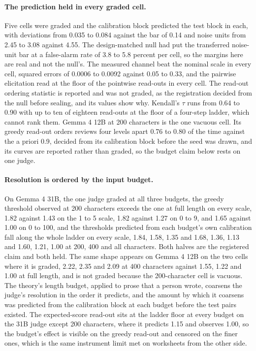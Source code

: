 \paragraph{The prediction held in every graded cell.}
Five cells were graded and the calibration block predicted the test block in each, with deviations from 0.035 to 0.084 against the bar of 0.14 and noise units from 2.45 to 3.08 against 4.55. The design-matched null had put the transferred noise-unit bar at a false-alarm rate of 3.8 to 5.8 percent per cell, so the margins here are real and not the null's. The measured channel beat the nominal scale in every cell, squared errors of 0.0006 to 0.0092 against 0.05 to 0.33, and the pairwise elicitation read at the floor of the pointwise read-outs in every cell. The read-out ordering statistic is reported and was not graded, as the registration decided from the null before sealing, and its values show why. Kendall's $\tau$ runs from 0.64 to 0.90 with up to ten of eighteen read-outs at the floor of a four-step ladder, which cannot rank them. Gemma 4 12B at 200 characters is the one vacuous cell. Its greedy read-out orders reviews four levels apart 0.76 to 0.80 of the time against the a priori 0.9, decided from its calibration block before the seed was drawn, and its curves are reported rather than graded, so the budget claim below rests on one judge.

\paragraph{Resolution is ordered by the input budget.}
On Gemma 4 31B, the one judge graded at all three budgets, the greedy threshold observed at 200 characters exceeds the one at full length on every scale, 1.82 against 1.43 on the 1 to 5 scale, 1.82 against 1.27 on 0 to 9, and 1.65 against 1.00 on 0 to 100, and the thresholds predicted from each budget's own calibration fall along the whole ladder on every scale, 1.84, 1.58, 1.35 and 1.68, 1.36, 1.13 and 1.60, 1.21, 1.00 at 200, 400 and all characters. Both halves are the registered claim and both held. The same shape appears on Gemma 4 12B on the two cells where it is graded, 2.22, 2.35 and 2.09 at 400 characters against 1.55, 1.22 and 1.00 at full length, and is not graded because the 200-character cell is vacuous. The theory's length budget, applied to prose that a person wrote, coarsens the judge's resolution in the order it predicts, and the amount by which it coarsens was predicted from the calibration block at each budget before the test pairs existed. The expected-score read-out sits at the ladder floor at every budget on the 31B judge except 200 characters, where it predicts 1.15 and observes 1.00, so the budget's effect is visible on the greedy read-out and censored on the finer ones, which is the same instrument limit met on worksheets from the other side.

